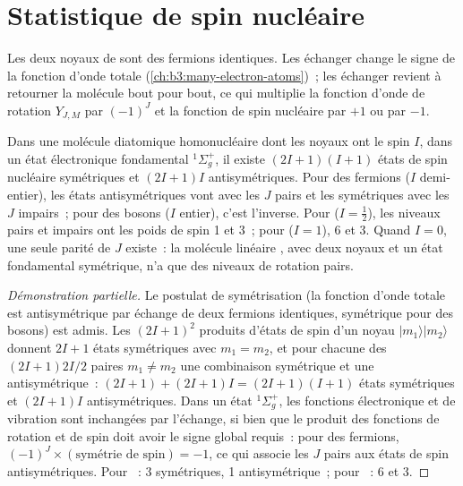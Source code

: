\section{Statistique de spin nucléaire}

Les deux noyaux de  sont des fermions identiques. Les échanger
change le signe de la fonction d'onde totale
(\cref{ch:b3:many-electron-atoms})~; les échanger revient à retourner la
molécule bout pour bout, ce qui multiplie la fonction d'onde de rotation
$Y_{J,M}$ par $(-1)^J$ et la fonction de spin nucléaire par $+1$ ou par
$-1$.

\begin{theorem}\label{thm:b3:statistical-thermo-applied:spin-statistics}
Dans une molécule diatomique homonucléaire dont les noyaux ont le spin
$I$, dans un état électronique fondamental ${}^1\Sigma_g^+$, il existe
$(2I+1)(I+1)$ états de spin nucléaire symétriques et $(2I+1)I$
antisymétriques. Pour des fermions ($I$ demi-entier), les états
antisymétriques vont avec les $J$ pairs et les symétriques avec les $J$
impairs~; pour des bosons ($I$ entier), c'est l'inverse. Pour 
($I = \frac12$), les niveaux pairs et impairs ont les poids de spin 1 et
3~; pour  ($I = 1$), 6 et 3. Quand $I = 0$, une seule parité de
$J$ existe~: la molécule linéaire , avec deux noyaux 
et un état fondamental symétrique, n'a que des niveaux de rotation pairs.
\end{theorem}

\begin{proof}[Démonstration partielle]
Le postulat de symétrisation (la fonction d'onde totale est
antisymétrique par échange de deux fermions identiques, symétrique pour
des bosons) est admis. Les
$(2I+1)^2$ produits d'états de spin d'un noyau $|m_1\rangle|m_2\rangle$
donnent $2I+1$ états symétriques
avec $m_1 = m_2$, et pour chacune des $(2I+1)2I/2$ paires $m_1 \ne m_2$
une combinaison symétrique et une antisymétrique~: $(2I+1) + (2I+1)I = (2I+1)(I+1)$
états symétriques et $(2I+1)I$ antisymétriques. Dans un état
${}^1\Sigma_g^+$, les fonctions électronique et de vibration sont
inchangées par l'échange, si bien que le produit des fonctions de
rotation et de spin doit avoir le signe global requis~: pour des
fermions, $(-1)^J \times(\text{symétrie de spin}) = -1$, ce qui associe
les $J$ pairs aux états de spin antisymétriques. Pour ~: 3
symétriques, 1 antisymétrique~; pour ~: 6 et
3.
\end{proof}

